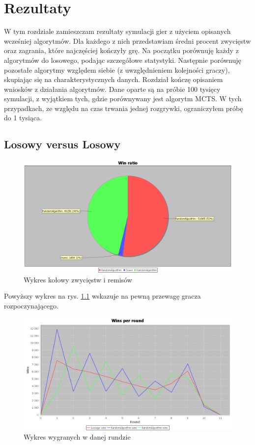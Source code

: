 \chapter{Rezultaty}
\label{cha:rozdz5}

W tym rozdziale zamieszczam rezultaty symulacji gier z użyciem opisanych wcześniej algorytmów. Dla każdego z nich przedstawiam średni procent zwycięstw oraz zagrania, które najczęściej kończyły grę. Na początku porównuję każdy z algorytmów do losowego, podając szczegółowe statystyki. Następnie porównuję pozostałe algorytmy względem siebie (z uwzględnieniem kolejności graczy), skupiając się na charakterystycznych danych. Rozdział kończę opisaniem wniosków z działania algorytmów. Dane oparte są na próbie 100 tysięcy symulacji, z wyjątkiem tych, gdzie porównywany jest algorytm MCTS. W tych przypadkach, ze względu na czas trwania jednej rozgrywki, ograniczyłem próbę do 1 tysiąca.


\section{Losowy versus Losowy}

\begin{figure}[H]
	\centering
	\includegraphics[width=\textwidth]{Resources/RVsR/RVsRwin.PNG}
	\caption{Wykres kołowy zwycięstw i remisów} 
	\label{fig:RVsRwin}
\end{figure}

Powyższy wykres na rys. \ref{fig:RVsRwin} wskazuje na pewną przewagę gracza rozpoczynającego.

\begin{figure}[H]
	\centering
	\includegraphics[width=\textwidth]{Resources/RVsR/RVsRroundwin.PNG}
	\caption{Wykres wygranych w danej rundzie} 
	\label{fig:RVsRroundwin}
\end{figure}

